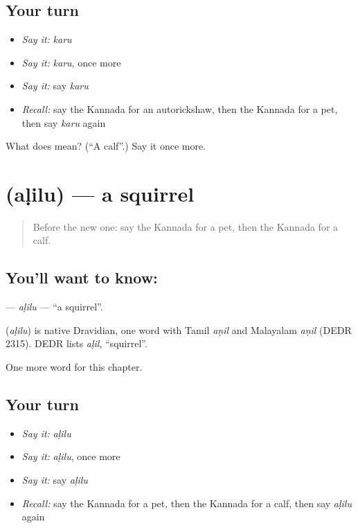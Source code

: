 \subsection*{Your turn}
\begin{itemize}
\raggedright
  \item \emph{Say it:} \emph{karu}
  \item \emph{Say it:} \emph{karu}, once more
  \item \emph{Say it:} say \emph{karu}
  \item \emph{Recall:} say the Kannada for an autorickshaw, then the Kannada for a pet, then say \emph{karu} again
\end{itemize}

\begin{tcolorbox}[breakable,colback=teal!4,colframe=teal!35!black,title={Before you move on}]
What does  mean? (\textquotedblleft{}A calf\textquotedblright{}.) Say it once more.
\end{tcolorbox}
\section[\texorpdfstring{\kn{ಅಳಿಲು} (aḷilu)}{ಅಳಿಲು (aḷilu)}]{ (aḷilu) — a squirrel}

\label{lesson:KA-C261-alilu}



\begin{quote}
Before the new one: say the Kannada for a pet, then the Kannada for a calf.
\end{quote}

\subsection*{You'll want to know: }
\textbf{} — \emph{aḷilu} — \textquotedblleft{}a squirrel\textquotedblright{}.

\begin{cousinweb}
\textbf{} (\emph{aḷilu}) is native Dravidian, one word with Tamil \emph{aṇil} and Malayalam \emph{aṇil} (DEDR 2315). DEDR lists \emph{aḷil}, \textquotedblleft{}squirrel\textquotedblright{}.
\end{cousinweb}

\begin{grammarlens}[title={What you've built}]
One more word for this chapter.
\end{grammarlens}

\subsection*{Your turn}
\begin{itemize}
\raggedright
  \item \emph{Say it:} \emph{aḷilu}
  \item \emph{Say it:} \emph{aḷilu}, once more
  \item \emph{Say it:} say \emph{aḷilu}
  \item \emph{Recall:} say the Kannada for a pet, then the Kannada for a calf, then say \emph{aḷilu} again
\end{itemize}

